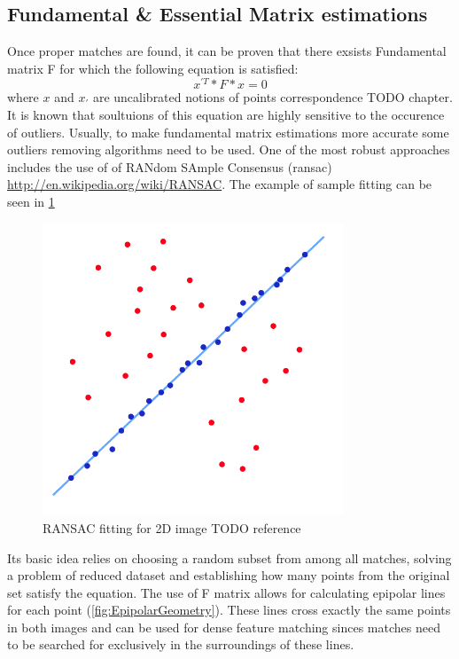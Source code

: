 \subsection{Fundamental \& Essential Matrix estimations}
Once proper matches are found, it can be proven that there exsists Fundamental matrix F for which the following equation is satisfied:
\begin{equation} \label{eq:fundamntalEquation}
{x}^{'T} * F * x = 0
\end{equation} 
where $x$ and ${x}_{'}$ are uncalibrated notions of points correspondence \cite{HartletMultipleView}TODO chapter. It is known that soultuions of this equation are highly sensitive to the occurence of outliers. Usually, to make fundamental matrix estimations more accurate some outliers removing algorithms need to be used. One of the most robust approaches includes the use of of RANdom SAmple Consensus (\gls{ransac}) \url{http://en.wikipedia.org/wiki/RANSAC}. The example of sample fitting can be seen in \ref{fig:RANSACFitting}
\begin{figure}[p]
    \centering
    \includegraphics[width=0.8\textwidth]{RANSACFitting}
    \caption{RANSAC fitting for 2D image TODO reference}
    \label{fig:RANSACFitting}
\end{figure}
Its basic idea relies on choosing a random subset from among all matches, solving a problem of reduced dataset and establishing how many points from the original set satisfy the equation.
The use of F matrix allows for calculating epipolar lines for each point (\ref{fig:EpipolarGeometry}). These lines cross exactly the same points in both images and can be used for dense feature matching sinces matches need to be searched for exclusively in the surroundings of these lines.
